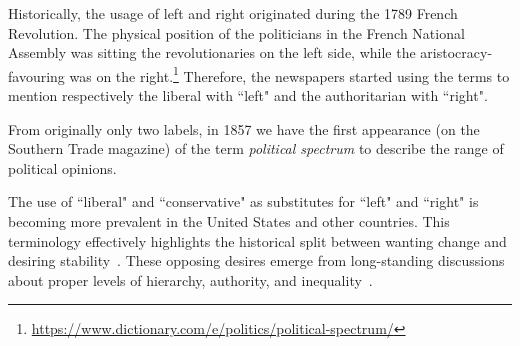 Historically, the usage of left and right originated during the 1789 French Revolution. The physical position of the politicians in the French National Assembly was sitting the revolutionaries on the left side, while the aristocracy-favouring was on the right.\footnote{\url{https://www.dictionary.com/e/politics/political-spectrum/}}
Therefore, the newspapers started using the terms to mention respectively the liberal with ``left" and the authoritarian with ``right".

From originally only two labels, in 1857 we have the first appearance (on the Southern Trade magazine) of the term \emph{political spectrum} to describe the range of political opinions.


The use of ``liberal" and ``conservative" as substitutes for ``left" and ``right" is becoming more prevalent in the United States and other countries.
This terminology effectively highlights the historical split between wanting change and desiring stability~\cite{jost2009political}.
These opposing desires emerge from long-standing discussions about proper levels of hierarchy, authority, and inequality~\citep{bobbio1996left}.





